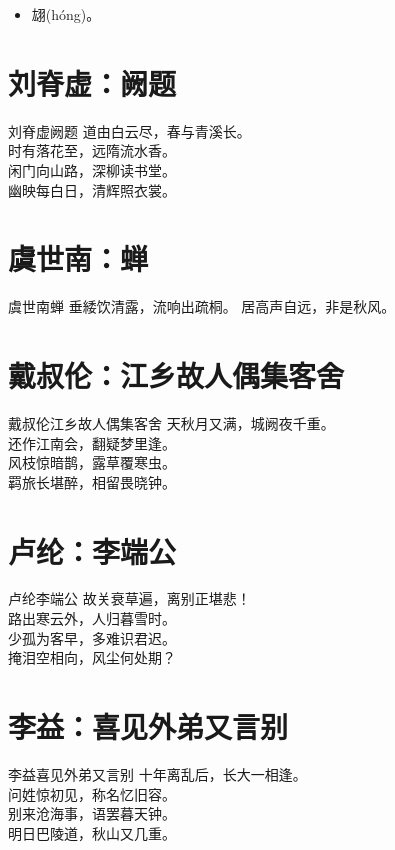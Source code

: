 \documentclass[12pt,oneside,a5paper]{book}
\begin{document}
\begin{itemize}
\item 翃(hóng)。
\end{itemize}

\chapter{刘脊虚：阙题}
\begin{poemzh}{刘脊虚}{阙题}
道由白云尽，春与青溪长。\\
时有落花至，远隋流水香。\\
闲门向山路，深柳读书堂。\\
幽映每白日，清辉照衣裳。\\ 
\end{poemzh}

\chapter{虞世南：蝉}
\begin{poemzh}{虞世南}{蝉}
垂緌饮清露，流响出疏桐。
居高声自远，非是秋风。
\end{poemzh}

\chapter{戴叔伦：江乡故人偶集客舍}
\begin{poemzh}{戴叔伦}{江乡故人偶集客舍}
天秋月又满，城阙夜千重。\\
还作江南会，翻疑梦里逢。\\
风枝惊暗鹊，露草覆寒虫。\\
羁旅长堪醉，相留畏晓钟。\\ 
\end{poemzh}

\chapter{卢纶：李端公}
\begin{poemzh}{卢纶}{李端公}
故关衰草遍，离别正堪悲！\\
路出寒云外，人归暮雪时。\\
少孤为客早，多难识君迟。\\
掩泪空相向，风尘何处期？\\ 
\end{poemzh}

\chapter{李益：喜见外弟又言别}
\begin{poemzh}{李益}{喜见外弟又言别}
十年离乱后，长大一相逢。\\
问姓惊初见，称名忆旧容。\\
别来沧海事，语罢暮天钟。\\
明日巴陵道，秋山又几重。\\ 
\end{poemzh}
\end{document}

